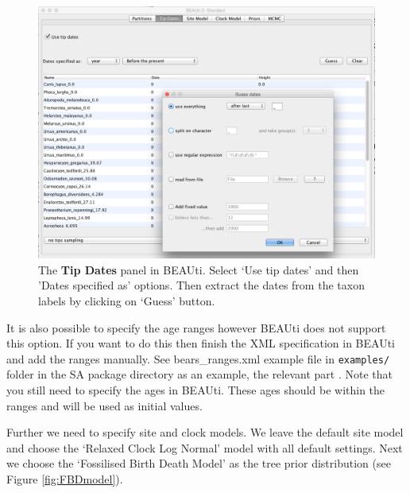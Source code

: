 \documentclass[12pt]{article}
\begin{document}
\begin{figure}	
\centering
\includegraphics[width=\textwidth]{figures/TipDates}
\caption{The {\bf Tip Dates} panel in BEAUti. Select `Use tip dates' and then 'Dates specified as' options. Then extract the dates from the taxon labels by clicking on `Guess' button.\label{fig:tipDates}}
\label{fig:BEAUti_ImportNexus}
\end{figure}
It is also possible to specify the age ranges however BEAUti does not support this option. If you want to do this then finish the XML specification in BEAUti and add the ranges manually.  See bears\_ranges.xml example file in {\tt examples/} folder in the SA package directory as an example, the relevant part . Note that you still need to specify the ages in BEAUti. These ages should be within the ranges and will be used as initial values. 

Further we need to specify site and clock models. We leave the default site model and choose the `Relaxed Clock Log Normal' model with all default settings. Next we choose the `Fossilised Birth Death Model' as the tree prior distribution (see Figure \ref{fig:FBDmodel}).
\end{document}

